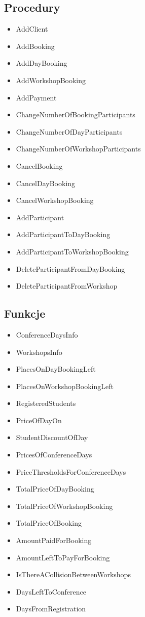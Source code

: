 \documentclass[12pt, a4paper]{mwrep}
\begin{document}
\subsection{Procedury}

\begin{itemize}
  \item AddClient
  \item AddBooking
  \item AddDayBooking
  \item AddWorkshopBooking
  \item AddPayment
  \item ChangeNumberOfBookingParticipants
  \item ChangeNumberOfDayParticipants
  \item ChangeNumberOfWorkshopParticipants
  \item CancelBooking
  \item CancelDayBooking
  \item CancelWorkshopBooking
  \item AddParticipant
  \item AddParticipantToDayBooking
  \item AddParticipantToWorkshopBooking
  \item DeleteParticipantFromDayBooking
  \item DeleteParticipantFromWorkshop
\end{itemize}

\subsection{Funkcje}

\begin{itemize}
  \item ConferenceDaysInfo
  \item WorkshopsInfo
  \item PlacesOnDayBookingLeft
  \item PlacesOnWorkshopBookingLeft
  \item RegisteredStudents
  \item PriceOfDayOn
  \item StudentDiscountOfDay
  \item PricesOfConferenceDays
  \item PriceThresholdsForConferenceDays
  \item TotalPriceOfDayBooking
  \item TotalPriceOfWorkshopBooking
  \item TotalPriceOfBooking
  \item AmountPaidForBooking
  \item AmountLeftToPayForBooking
  \item IsThereACollisionBetweenWorkshops
  \item DaysLeftToConference
  \item DaysFromRegistration
\end{itemize}
\end{document}
